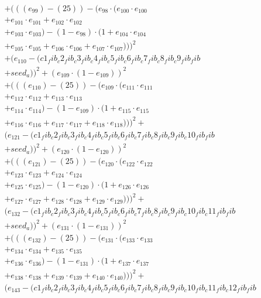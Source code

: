 \documentclass[10pt, a4paper]{article}
\begin{document}
\begin{small}
\begin{align*}
& + (((e_{99}) - (25)) - (e_{98} \cdot (e_{100} \cdot e_{100} \\
& + e_{101} \cdot e_{101} + e_{102} \cdot e_{102} \\
& + e_{103} \cdot e_{103}) - (1 - e_{98}) \cdot (1 + e_{104} \cdot e_{104} \\
& + e_{105} \cdot e_{105} + e_{106} \cdot e_{106} + e_{107} \cdot e_{107})))^{2} \\
& + (e_{110} - (c1_fib_c2_fib_c3_fib_c4_fib_c5_fib_c6_fib_c7_fib_c8_fib_c9_fib_fib \\
& + seed_a))^{2} + (e_{109} \cdot (1 - e_{109}))^{2} \\
& + (((e_{110}) - (25)) - (e_{109} \cdot (e_{111} \cdot e_{111} \\
& + e_{112} \cdot e_{112} + e_{113} \cdot e_{113} \\
& + e_{114} \cdot e_{114}) - (1 - e_{109}) \cdot (1 + e_{115} \cdot e_{115} \\
& + e_{116} \cdot e_{116} + e_{117} \cdot e_{117} + e_{118} \cdot e_{118})))^{2} + \\
& (e_{121} - (c1_fib_c2_fib_c3_fib_c4_fib_c5_fib_c6_fib_c7_fib_c8_fib_c9_fib_c10_fib_fib \\
& + seed_a))^{2} + (e_{120} \cdot (1 - e_{120}))^{2} \\
& + (((e_{121}) - (25)) - (e_{120} \cdot (e_{122} \cdot e_{122} \\
& + e_{123} \cdot e_{123} + e_{124} \cdot e_{124} \\
& + e_{125} \cdot e_{125}) - (1 - e_{120}) \cdot (1 + e_{126} \cdot e_{126} \\
& + e_{127} \cdot e_{127} + e_{128} \cdot e_{128} + e_{129} \cdot e_{129})))^{2} + \\
& (e_{132} - (c1_fib_c2_fib_c3_fib_c4_fib_c5_fib_c6_fib_c7_fib_c8_fib_c9_fib_c10_fib_c11_fib_fib \\
& + seed_a))^{2} + (e_{131} \cdot (1 - e_{131}))^{2} \\
& + (((e_{132}) - (25)) - (e_{131} \cdot (e_{133} \cdot e_{133} \\
& + e_{134} \cdot e_{134} + e_{135} \cdot e_{135} \\
& + e_{136} \cdot e_{136}) - (1 - e_{131}) \cdot (1 + e_{137} \cdot e_{137} \\
& + e_{138} \cdot e_{138} + e_{139} \cdot e_{139} + e_{140} \cdot e_{140})))^{2} + \\
& (e_{143} - (c1_fib_c2_fib_c3_fib_c4_fib_c5_fib_c6_fib_c7_fib_c8_fib_c9_fib_c10_fib_c11_fib_c12_fib_fib \\

\end{align*}
\end{small}
\end{document}
